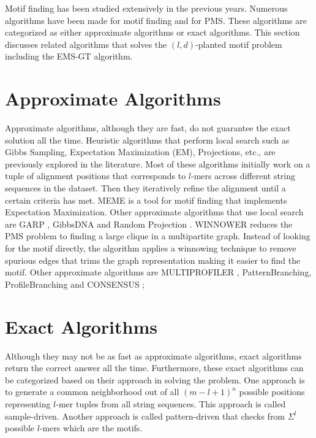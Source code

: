 Motif finding has been studied extensively in the previous years. Numerous algorithms have been made for motif finding and for PMS. These algorithms are categorized as either approximate algorithms or exact algorithms. This section discusses related algorithms that solves the $(l, d)$-planted motif problem including the EMS-GT algorithm.

\section{Approximate Algorithms}
Approximate algorithms, although they are fast, do not guarantee the exact solution all the time. Heuristic algorithms that perform local search such as Gibbs Sampling, Expectation Maximization (EM),  Projections, etc., are previously explored in the literature. Most of these algorithms initially work on a tuple of alignment positions that corresponds to $l$-mers across different string sequences in the dataset. Then they iteratively refine the alignment until a certain criteria has met. MEME \cite{Bailey2006} is a tool for motif finding that implements Expectation Maximization. Other approximate algorithms that use local search are GARP \cite{huo2009combining}, GibbsDNA \cite{lawrence1993detecting} and Random Projection \cite{Buhler2001Tompa, huo2009combining}. WINNOWER \cite{pevzner2000combinatorial} reduces the PMS problem to finding a large clique in a multipartite graph. Instead of looking for the motif directly, the algorithm applies a winnowing technique to remove spurious edges that trims the graph representation making it easier to find the motif. Other approximate algorithms are MULTIPROFILER \cite{Keich01102002},  PatternBranching, ProfileBranching \cite{Price27092003} and CONSENSUS \cite{hertz1999identifying};

\section{Exact Algorithms}
Although they may not be as fast as approximate algorithms, exact algorithms return the correct answer all the time. Furthermore, these exact algorithms can be categorized based on their approach in solving the problem. One approach is to generate a common neighborhood out of all $(m - l + 1)^n$ possible positions representing $l$-mer tuples from all string sequences. This approach is called sample-driven. Another approach is called pattern-driven that checks from $\Sigma^l$ possible $l$-mers which are the motifs. 

